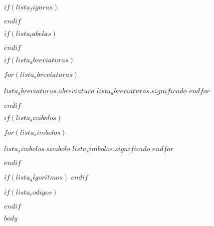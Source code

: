 \documentclass[
	oldfontcommands,
	sumario=abnt-6027-2012,
	12pt,
	openright,
	oneside,
	a4paper,
	english,
	brazil
	]{imecc-unicamp}
\begin{document}
$if(lista_figuras)$
  \listoffigures*
  \cleardoublepage
$endif$

$if(lista_tabelas)$
  \listoftables*
  \cleardoublepage
$endif$

$if(lista_abreviaturas)$
  \begin{siglas}
    $for(lista_abreviaturas)$
    \item[$lista_abreviaturas.abreviatura$] $lista_abreviaturas.significado$
    $endfor$
  \end{siglas}
$endif$

$if(lista_simbolos)$
\begin{simbolos}
  $for(lista_simbolos)$
  \item[$lista_simbolos.simbolo$] $lista_simbolos.significado$
  $endfor$
\end{simbolos}
$endif$

$if(lista_algoritmos)$
\listofalgorithms
\cleardoublepage
$endif$

$if(lista_codigos)$
\begin{KeepFromToc}
\lstlistoflistings
\end{KeepFromToc}
\cleardoublepage
$endif$

\tableofcontents*
\cleardoublepage

\textual

$body$

\printindex
\end{document}
